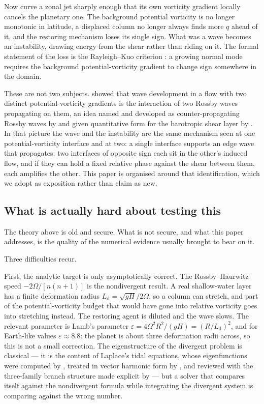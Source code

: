 Now curve a zonal jet sharply enough that its own vorticity gradient locally
cancels the planetary one. The background potential vorticity is no longer
monotonic in latitude, a displaced column no longer always finds more $q$ ahead of
it, and the restoring mechanism loses its single sign. What was a wave becomes an
instability, drawing energy from the shear rather than riding on it. The formal
statement of the loss is the Rayleigh--Kuo criterion \citep{kuo1949}: a growing
normal mode requires the background potential-vorticity gradient to change sign
somewhere in the domain.

These are not two subjects. \citet{bretherton1966} showed that wave development in
a flow with two distinct potential-vorticity gradients is the interaction of two
Rossby waves propagating on them, an idea named and developed as
counter-propagating Rossby waves by \citet{hoskins1985} and given quantitative
form for the barotropic shear layer by \citet{heifetz1999}. In that picture the
wave and the instability are the same mechanism seen at one potential-vorticity
interface and at two: a single interface supports an edge wave that propagates; two
interfaces of opposite sign each sit in the other's induced flow, and if they can
hold a fixed relative phase against the shear between them, each amplifies the
other. This paper is organised around that identification, which we adopt as
exposition rather than claim as new.

\subsection{What is actually hard about testing this}

The theory above is old and secure. What is not secure, and what this paper
addresses, is the quality of the numerical evidence usually brought to bear on it.

Three difficulties recur.

First, the analytic target is only asymptotically correct. The Rossby--Haurwitz
speed $-2\Omega/[n(n+1)]$ is the nondivergent result. A real shallow-water layer
has a finite deformation radius $L_{\mathrm d} = \sqrt{gH}/2\Omega$, so a column
can stretch, and part of the potential-vorticity budget that would have gone into
relative vorticity goes into stretching instead. The restoring agent is diluted
and the wave slows. The relevant parameter is Lamb's parameter
$\varepsilon = 4\Omega^2R^2/(gH) = (R/L_{\mathrm d})^2$, and for Earth-like values
$\varepsilon \approx 8.8$: the planet is about three deformation radii across, so
this is not a small correction. The eigenstructure of the divergent problem is
classical --- it is the content of Laplace's tidal equations, whose
eigenfunctions were computed by \citet{longuethiggins1968}, treated in vector
harmonic form by \citet{swarztrauber1985}, and reviewed with the three-family
branch structure made explicit by \citet{kasahara1976} --- but a solver that
compares itself against the nondivergent formula while integrating the divergent
system is comparing against the wrong number.

